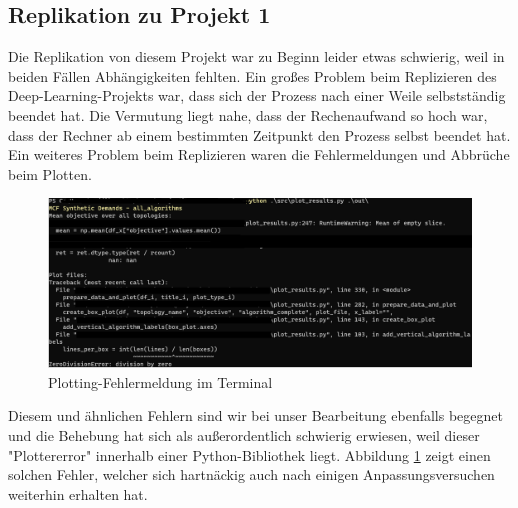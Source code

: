 \documentclass[sigconf, nonacm, review]{acmart}
\begin{document}
\subsection{Replikation zu Projekt 1}
Die Replikation von diesem Projekt war zu Beginn leider etwas schwierig, weil in beiden F\"allen Abh\"angigkeiten fehlten.
Ein gro\ss es Problem beim Replizieren des Deep-Learning-Projekts war, dass sich der Prozess nach einer Weile selbstst\"andig beendet hat.
Die Vermutung liegt nahe, dass der Rechenaufwand so hoch war, dass der Rechner ab einem bestimmten Zeitpunkt den Prozess selbst beendet hat.
Ein weiteres Problem beim Replizieren waren die Fehlermeldungen und Abbr\"uche beim Plotten. 
\begin{figure}
\centering
\includegraphics[width=\linewidth]{figures/repl_p1_plottererror.png}
\caption{Plotting-Fehlermeldung im Terminal}
\label{fig:repl_p1_plottererrror}
\end{figure}
Diesem und \"ahnlichen Fehlern sind wir bei unser Bearbeitung ebenfalls begegnet und die Behebung hat sich als au\ss erordentlich schwierig erwiesen, weil dieser "Plottererror" innerhalb einer Python-Bibliothek liegt.
Abbildung \ref{fig:repl_p1_plottererrror} zeigt einen solchen Fehler,
welcher sich hartn\"ackig auch nach einigen Anpassungsversuchen weiterhin erhalten hat.
\end{document}
